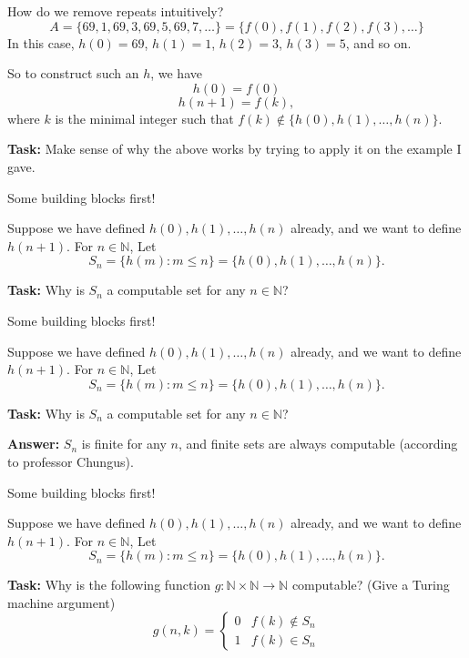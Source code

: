 \documentclass{beamer}
\begin{document}
\begin{frame}{How do we remove repeats intuitively?}
$$A = \{69, 1, 69, 3, 69, 5, 69, 7, \ldots\} = \{f(0), f(1), f(2), f(3), \ldots\}$$
In this case, $h(0) = 69$, $h(1) = 1$, $h(2) = 3$, $h(3) = 5$, and so on. 

\vspace{2mm}

So to construct such an $h$, we have
$$h(0) = f(0)$$
$$h(n + 1) = f(k),$$ where $k$ is the minimal integer such that $f(k) \notin \{h(0), h(1), \ldots, h(n)\}$.

\textbf{Task:} Make sense of why the above works by trying to apply it on the example I gave.
\end{frame}

\begin{frame}{Some building blocks first!}

Suppose we have defined $h(0), h(1), \ldots, h(n)$ already, and we want to define $h(n + 1)$. For $n \in \mathbb N$, Let $$S_n = \{h(m): m \leq n\} = \{h(0), h(1), \ldots, h(n)\}.$$

\vspace{2mm}

\textbf{Task:} Why is $S_n$ a computable set for any $n \in \mathbb N$?


\end{frame}

\begin{frame}{Some building blocks first!}

Suppose we have defined $h(0), h(1), \ldots, h(n)$ already, and we want to define $h(n + 1)$. For $n \in \mathbb N$, Let $$S_n = \{h(m): m \leq n\} = \{h(0), h(1), \ldots, h(n)\}.$$

\vspace{2mm}

\textbf{Task:} Why is $S_n$ a computable set for any $n \in \mathbb N$?

\textbf{Answer:} $S_n$ is finite for any $n$, and finite sets are always computable (according to professor Chungus).

\end{frame}

\begin{frame}{Some building blocks first!}

Suppose we have defined $h(0), h(1), \ldots, h(n)$ already, and we want to define $h(n + 1)$. For $n \in \mathbb N$, Let $$S_n = \{h(m): m \leq n\} = \{h(0), h(1), \ldots, h(n)\}.$$

\vspace{2mm}

\textbf{Task:} Why is the following function $g: \mathbb N \times \mathbb N \to \mathbb N$ computable? (Give a Turing machine argument)
$$g(n, k) = \begin{cases}
0 & f(k) \notin S_n\\
1 & f(k) \in S_n
\end{cases}$$

\end{frame}
\end{document}
